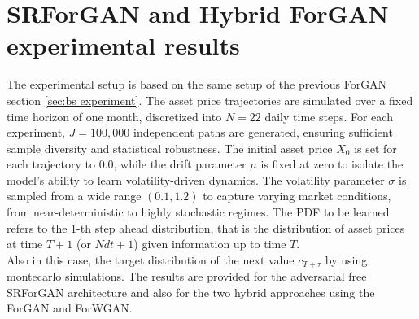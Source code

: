 
\section{SRForGAN and Hybrid ForGAN experimental results}

The experimental setup is based on the same setup of the previous ForGAN section \ref{sec:bs experiment}.
The asset price trajectories are simulated over a fixed time horizon of one month, discretized into $N=22$ daily time steps.
For each experiment, $J=100{,}000$ independent paths are generated, ensuring sufficient sample diversity and statistical robustness.
The initial asset price $X_0$ is set for each trajectory to $0.0$, while the drift parameter $\mu$ is fixed at zero to isolate the model's ability to learn volatility-driven dynamics.
The volatility parameter $\sigma$ is sampled from a wide range $(0.1, 1.2)$ to capture varying market conditions, from near-deterministic to highly stochastic regimes.
The PDF to be learned refers to the $1$-th step ahead distribution, that is the distribution of asset prices at time $T + 1$ (or $N dt + 1$) given information up to time $T$.\\

Also in this case, the target distribution of the next value $c_{T + \tau}$  by using montecarlo simulations. 
The results are provided for the adversarial free SRForGAN architecture and also for the two 
hybrid approaches using the ForGAN and ForWGAN.\\



